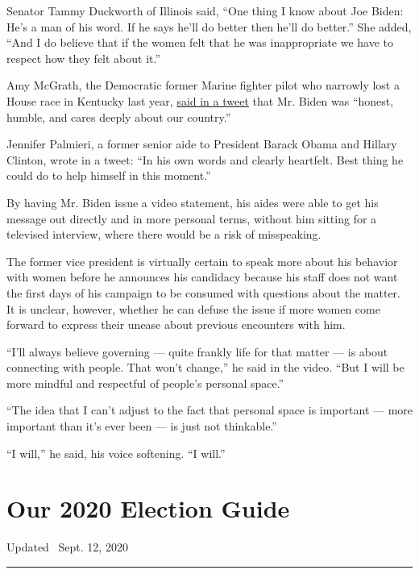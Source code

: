 Senator Tammy Duckworth of Illinois said, ``One thing I know about Joe
Biden: He's a man of his word. If he says he'll do better then he'll do
better.'' She added, ``And I do believe that if the women felt that he
was inappropriate we have to respect how they felt about it.''

Amy McGrath, the Democratic former Marine fighter pilot who narrowly
lost a House race in Kentucky last year,
\href{https://twitter.com/AmyMcGrathKY/status/1113540816281198595}{said
in a tweet} that Mr. Biden was ``honest, humble, and cares deeply about
our country.''

Jennifer Palmieri, a former senior aide to President Barack Obama and
Hillary Clinton, wrote in a tweet: ``In his own words and clearly
heartfelt. Best thing he could do to help himself in this moment.''

By having Mr. Biden issue a video statement, his aides were able to get
his message out directly and in more personal terms, without him sitting
for a televised interview, where there would be a risk of misspeaking.

The former vice president is virtually certain to speak more about his
behavior with women before he announces his candidacy because his staff
does not want the first days of his campaign to be consumed with
questions about the matter. It is unclear, however, whether he can
defuse the issue if more women come forward to express their unease
about previous encounters with him.

``I'll always believe governing --- quite frankly life for that matter
--- is about connecting with people. That won't change,'' he said in the
video. ``But I will be more mindful and respectful of people's personal
space.''

``The idea that I can't adjust to the fact that personal space is
important --- more important than it's ever been --- is just not
thinkable.''

``I will,'' he said, his voice softening. ``I will.''

\hypertarget{our-2020-election-guide}{%
\section{Our 2020 Election Guide}\label{our-2020-election-guide}}

Updated ~Sept. 12, 2020

\begin{center}\rule{0.5\linewidth}{\linethickness}\end{center}

